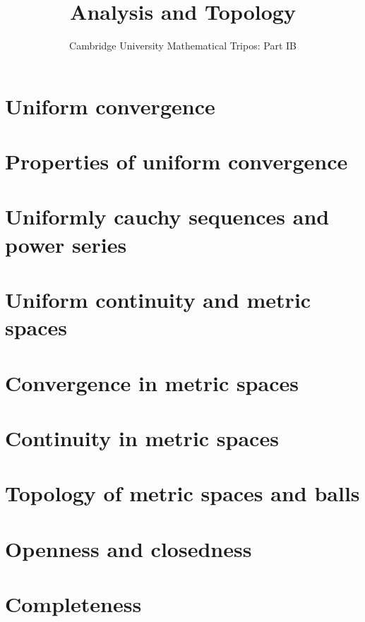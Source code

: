 \documentclass{article}
\title{Analysis and Topology}
\author{Cambridge University Mathematical Tripos: Part IB}
\begin{document}
\maketitle

\tableofcontentsnewpage{}

\section{Uniform convergence}

\section{Properties of uniform convergence}

\section{Uniformly cauchy sequences and power series}

\section{Uniform continuity and metric spaces}

\section{Convergence in metric spaces}

\section{Continuity in metric spaces}

\section{Topology of metric spaces and balls}

\section{Openness and closedness}

\section{Completeness}

\end{document}
